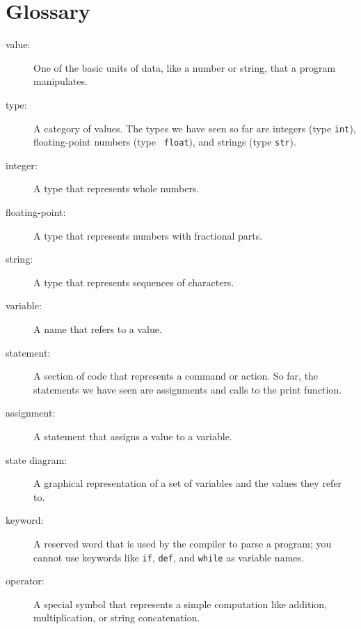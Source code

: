 \documentclass[10pt]{book}
\begin{document}


\section{Glossary}

\begin{description}

\item[value:]  One of the basic units of data, like a number or string, 
that a program manipulates.

\item[type:] A category of values.  The types we have seen so far
are integers (type {\tt int}), floating-point numbers (type {\tt
float}), and strings (type {\tt str}).

\item[integer:] A type that represents whole numbers.

\item[floating-point:] A type that represents numbers with fractional
parts.

\item[string:] A type that represents sequences of characters.

\item[variable:]  A name that refers to a value.

\item[statement:]  A section of code that represents a command or action.  So
far, the statements we have seen are assignments and calls to the print function.

\item[assignment:]  A statement that assigns a value to a variable.

\item[state diagram:]  A graphical representation of a set of variables and the
values they refer to.

\item[keyword:]  A reserved word that is used by the compiler to parse a
program; you cannot use keywords like {\tt if}, {\tt  def}, and {\tt while} as
variable names.

\item[operator:]  A special symbol that represents a simple computation like
addition, multiplication, or string concatenation.


\end{description}
\end{document}
